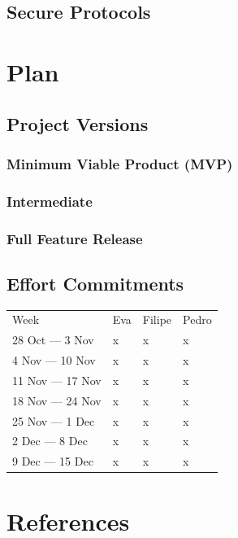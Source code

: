 \documentclass[a4paper]{article}
\begin{document}
\subsection{Secure Protocols}

\section{Plan}

\subsection{Project Versions}

\subsubsection{Minimum Viable Product (MVP)}

\subsubsection{Intermediate}

\subsubsection{Full Feature Release}

\subsection{Effort Commitments}

\begin{tabular}{llll}
    Week & Eva & Filipe & Pedro\\
    28 Oct --- 3 Nov & x & x & x\\
    4 Nov --- 10 Nov & x & x & x\\
    11 Nov --- 17 Nov & x & x & x\\
    18 Nov --- 24 Nov & x & x & x\\
    25 Nov --- 1 Dec & x & x & x\\
    2 Dec --- 8 Dec & x & x & x\\
    9 Dec --- 15 Dec & x & x & x\\
\end{tabular}

\section{References}
\end{document}
